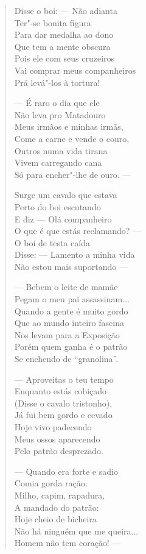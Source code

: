 \begin{verse}
Disse o boi: ---  Não adianta \\
Ter"-se bonita figura \\
Para dar medalha ao dono \\
Que tem a mente obscura \\
Pois ele com seus cruzeiros \\
Vai comprar meus companheiros \\
Prá levá"-los à tortura! 

---  É raro o dia que ele \\
Não leva pro Matadouro \\
Meus irmãos e minhas irmãs, \\
Come a carne e vende o couro, \\
Outros numa vida tirana \\
Vivem carregando cana \\
Só para encher"-lhe de ouro. ---

Surge um cavalo que estava \\
Perto do boi escutando \\
E diz ---  Olá companheiro \\
O que é que estás reclamando? --- \\
O boi de testa caída \\
Disse: ---  Lamento a minha vida \\
Não estou mais suportando ---  


---  Bebem o leite de mamãe \\
Pegam o meu pai assassinam... \\
Quando a gente é muito gordo \\
Que ao mundo inteiro fascina \\
Nos levam para a Exposição \\
Porém quem ganha é o patrão \\
Se enchendo de ``granolina''. 

---  Aproveitas o teu tempo \\
Enquanto estás cobiçado \\
(Disse o cavalo tristonho), \\
Já fui bem gordo e cevado \\
Hoje vivo padecendo \\
Meus ossos aparecendo \\
Pelo patrão desprezado. 

---  Quando era forte e sadio \\
Comia gorda ração: \\
Milho, capim, rapadura, \\
A mandado do patrão: \\
Hoje cheio de bicheira \\
Não há ninguém que me queira... \\
Homem não tem coração! ---


\end{verse}
